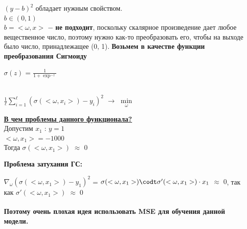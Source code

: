         \hline
        $(y - b)^2$ обладает нужным свойством.\\

        $b \in (0, 1)$\\

        $b = <\omega, x>$ $-$ \textbf{не подходит}, поскольку скалярное произведение дает любое вещественное число, поэтому нужно как-то преобразовать его, чтобы на выходе было число, принадлежащее (0, 1). \textbf{Возьмем в качестве функции преобразования Сигмоиду}\\

        \begin{center}
            \large{$\sigma(z)$ = $\frac{1}{1 + \exp^{-z}}$}
        \end{center}
        
        \begin{center}
        \\
        
            \Large{$\frac{1}{\ell}\sum\limits_{i = 1}^\ell(\sigma(<\omega, x_i>) - y_i)^2$ $\longrightarrow$ $\min\limits_\omega$}
        \end{center}

        \underline{\textbf{В чем проблемы данного функционала?}}\\

        Допустим $x_1$ : $y = 1$\\

        $<\omega, x_1> = -1000$\\

        Тогда $\sigma(<\omega, x_1>)$ $\approx$ $0$\\


        \begin{center}
            \textbf{Проблема затухания ГС:}
        \end{center}
        
        $\nabla_\omega(\sigma(<\omega, x_1>) - y_1)^2$ = $\sigma(<\omega, x_1>) \codt \sigma'(<\omega, x_1>) \cdot x_1$ $\approx$ $0$, \quad так как $\sigma'(<\omega, x_1>)$ $\approx$ $0$\\


        \\ 

        \textbf{Поэтому очень плохая идея использовать MSE для обучения данной модели.}

